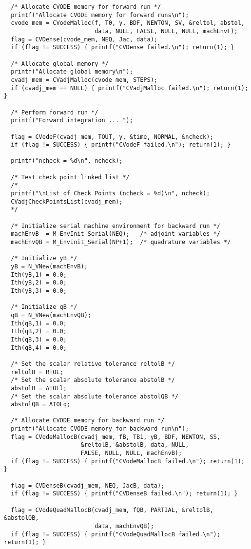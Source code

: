 \begin{verbatim}
  /* Allocate CVODE memory for forward run */
  printf("Allocate CVODE memory for forward runs\n");
  cvode_mem = CVodeMalloc(f, T0, y, BDF, NEWTON, SV, &reltol, abstol,
                          data, NULL, FALSE, NULL, NULL, machEnvF);
  flag = CVDense(cvode_mem, NEQ, Jac, data);
  if (flag != SUCCESS) { printf("CVDense failed.\n"); return(1); }

  /* Allocate global memory */
  printf("Allocate global memory\n");
  cvadj_mem = CVadjMalloc(cvode_mem, STEPS);
  if (cvadj_mem == NULL) { printf("CVadjMalloc failed.\n"); return(1); }

  /* Perform forward run */
  printf("Forward integration ... ");
  
  flag = CVodeF(cvadj_mem, TOUT, y, &time, NORMAL, &ncheck);
  if (flag != SUCCESS) { printf("CVodeF failed.\n"); return(1); }

  printf("ncheck = %d\n", ncheck);

  /* Test check point linked list */
  /*
  printf("\nList of Check Points (ncheck = %d)\n", ncheck);
  CVadjCheckPointsList(cvadj_mem);
  */

  /* Initialize serial machine environment for backward run */ 
  machEnvB  = M_EnvInit_Serial(NEQ);   /* adjoint variables */
  machEnvQB = M_EnvInit_Serial(NP+1);  /* quadrature variables */

  /* Initialize yB */
  yB = N_VNew(machEnvB);
  Ith(yB,1) = 0.0;
  Ith(yB,2) = 0.0;
  Ith(yB,3) = 0.0;

  /* Initialize qB */
  qB = N_VNew(machEnvQB);
  Ith(qB,1) = 0.0;
  Ith(qB,2) = 0.0;
  Ith(qB,3) = 0.0;
  Ith(qB,4) = 0.0;

  /* Set the scalar relative tolerance reltolB */
  reltolB = RTOL;               
  /* Set the scalar absolute tolerance abstolB */
  abstolB = ATOLl;
  /* Set the scalar absolute tolerance abstolQB */
  abstolQB = ATOLq;

  /* Allocate CVODE memory for backward run */
  printf("Allocate CVODE memory for backward run\n");
  flag = CVodeMallocB(cvadj_mem, fB, TB1, yB, BDF, NEWTON, SS, 
                      &reltolB, &abstolB, data, NULL, 
                      FALSE, NULL, NULL, machEnvB);
  if (flag != SUCCESS) { printf("CVodeMallocB failed.\n"); return(1); }

  flag = CVDenseB(cvadj_mem, NEQ, JacB, data);
  if (flag != SUCCESS) { printf("CVDenseB failed.\n"); return(1); }

  flag = CVodeQuadMallocB(cvadj_mem, fQB, PARTIAL, &reltolB, &abstolQB,
                          data, machEnvQB);
  if (flag != SUCCESS) { printf("CVodeQuadMallocB failed.\n"); return(1); }


\end{verbatim}
